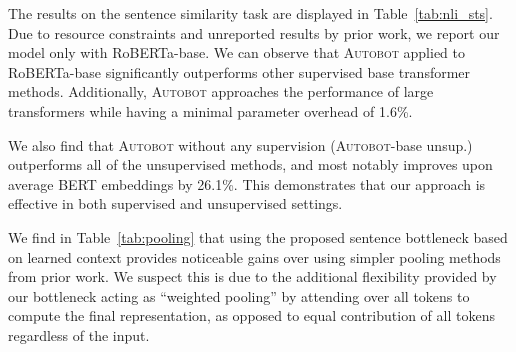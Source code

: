  The results on the sentence similarity task are displayed in Table~\ref{tab:nli_sts}.
 Due to resource constraints and unreported results by prior work, we report our model only with RoBERTa-base.
 We can observe that \textsc{Autobot} applied to RoBERTa-base significantly outperforms other supervised base transformer methods. Additionally,  \textsc{Autobot} approaches the performance of large  transformers while having a minimal   parameter   overhead of 1.6\%.    %

We also find that \textsc{Autobot} without any supervision (\textsc{Autobot}-base unsup.) outperforms all of the unsupervised methods, and most notably improves upon average BERT embeddings by 26.1\%. This demonstrates that our approach is effective in both supervised and unsupervised settings.
 
 
   
 
We find in Table~\ref{tab:pooling} that using the proposed sentence bottleneck based on learned context  provides 
noticeable gains over using simpler pooling methods from prior work. We suspect this is due to the additional flexibility provided by our bottleneck acting as ``weighted pooling'' by attending over all tokens to compute the final representation, as opposed to equal contribution of all tokens regardless of the input. 





